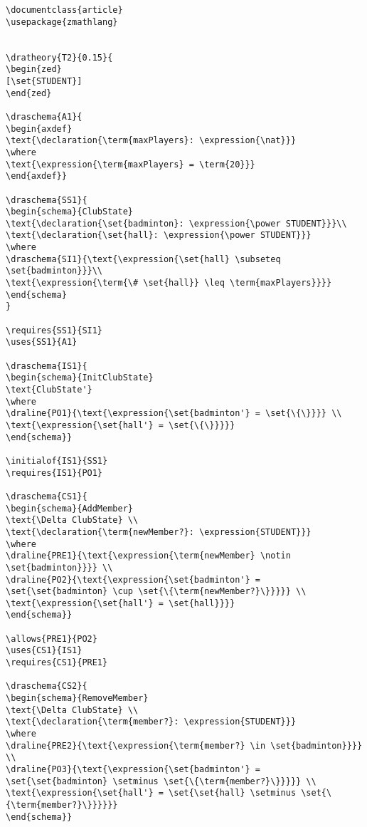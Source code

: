 \begin{verbatim}
\documentclass{article}
\usepackage{zmathlang}


\dratheory{T2}{0.15}{
\begin{zed}
[\set{STUDENT}]
\end{zed}

\draschema{A1}{
\begin{axdef}
\text{\declaration{\term{maxPlayers}: \expression{\nat}}}
\where
\text{\expression{\term{maxPlayers} = \term{20}}}
\end{axdef}}

\draschema{SS1}{
\begin{schema}{ClubState}
\text{\declaration{\set{badminton}: \expression{\power STUDENT}}}\\
\text{\declaration{\set{hall}: \expression{\power STUDENT}}}
\where
\draschema{SI1}{\text{\expression{\set{hall} \subseteq \set{badminton}}}\\
\text{\expression{\term{\# \set{hall}} \leq \term{maxPlayers}}}}
\end{schema}
}

\requires{SS1}{SI1}
\uses{SS1}{A1}

\draschema{IS1}{
\begin{schema}{InitClubState}
\text{ClubState'}
\where
\draline{PO1}{\text{\expression{\set{badminton'} = \set{\{\}}}} \\
\text{\expression{\set{hall'} = \set{\{\}}}}}
\end{schema}}

\initialof{IS1}{SS1}
\requires{IS1}{PO1}

\draschema{CS1}{
\begin{schema}{AddMember}
\text{\Delta ClubState} \\
\text{\declaration{\term{newMember?}: \expression{STUDENT}}}
\where
\draline{PRE1}{\text{\expression{\term{newMember} \notin \set{badminton}}}} \\
\draline{PO2}{\text{\expression{\set{badminton'} = \set{\set{badminton} \cup \set{\{\term{newMember?}\}}}}} \\
\text{\expression{\set{hall'} = \set{hall}}}}
\end{schema}}

\allows{PRE1}{PO2}
\uses{CS1}{IS1}
\requires{CS1}{PRE1}

\draschema{CS2}{
\begin{schema}{RemoveMember}
\text{\Delta ClubState} \\
\text{\declaration{\term{member?}: \expression{STUDENT}}}
\where
\draline{PRE2}{\text{\expression{\term{member?} \in \set{badminton}}}} \\
\draline{PO3}{\text{\expression{\set{badminton'} = \set{\set{badminton} \setminus \set{\{\term{member?}\}}}}} \\
\text{\expression{\set{hall'} = \set{\set{hall} \setminus \set{\{\term{member?}\}}}}}}
\end{schema}}


\end{verbatim}
